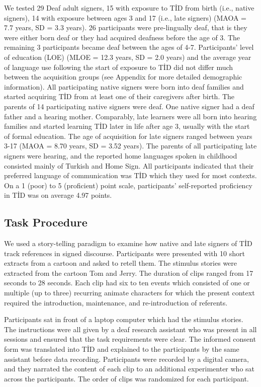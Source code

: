 \documentclass[
  english,
  doc,mask]{apa6}
\begin{document}
We tested 29 Deaf adult signers, 15 with exposure to TİD from birth (i.e., native signers), 14 with exposure between ages 3 and 17 (i.e., late signers) (MAOA = 7.7 years, SD = 3.3 years). 26 participants were pre-lingually deaf, that is they were either born deaf or they had acquired deafness before the age of 3. The remaining 3 participants became deaf between the ages of 4-7. Participants' level of education (LOE) (MLOE = 12.3 years, SD = 2.0 years) and the average year of language use following the start of exposure to TİD did not differ much between the acquisition groups (see Appendix for more detailed demographic information). All participating native signers were born into deaf families and started acquiring TİD from at least one of their caregivers after birth. The parents of 14 participating native signers were deaf. One native signer had a deaf father and a hearing mother. Comparably, late learners were all born into hearing families and started learning TİD later in life after age 3, usually with the start of formal education. The age of acquisition for late signers ranged between years 3-17 (MAOA = 8.70 years, SD = 3.52 years). The parents of all participating late signers were hearing, and the reported home languages spoken in childhood consisted mainly of Turkish and Home Sign. All participants indicated that their preferred language of communication was TİD which they used for most contexts. On a 1 (poor) to 5 (proficient) point scale, participants' self-reported proficiency in TİD was on average 4.97 points.

\hypertarget{task-procedure}{%
\subsection{\texorpdfstring{\textbf{Task Procedure}}{Task Procedure}}\label{task-procedure}}

We used a story-telling paradigm to examine how native and late signers of TİD track references in signed discourse. Participants were presented with 10 short extracts from a cartoon and asked to retell them. The stimulus stories were extracted from the cartoon Tom and Jerry. The duration of clips ranged from 17 seconds to 28 seconds. Each clip had six to ten events which consisted of one or multiple (up to three) recurring animate characters for which the present context required the introduction, maintenance, and re-introduction of referents.

Participants sat in front of a laptop computer which had the stimulus stories. The instructions were all given by a deaf research assistant who was present in all sessions and ensured that the task requirements were clear. The informed consent form was translated into TİD and explained to the participants by the same assistant before data recording. Participants were recorded by a digital camera, and they narrated the content of each clip to an additional experimenter who sat across the participants. The order of clips was randomized for each participant.
\end{document}
